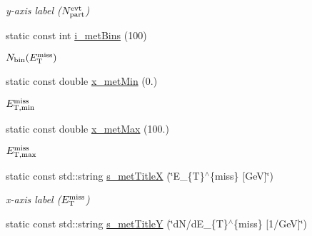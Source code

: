 \begin{CompactItemize}
\begin{CompactList}\small\item\em y-axis label ($N_{\rm part}^{\rm evt}$) \item\end{CompactList}\item 
\hypertarget{namespaceHistGroupCfg_a5919ec5c6e2e327615d4a42c79d1a22}{
static const int \hyperlink{namespaceHistGroupCfg_a5919ec5c6e2e327615d4a42c79d1a22}{i\_\-met\-Bins} (100)}
\label{namespaceHistGroupCfg_a5919ec5c6e2e327615d4a42c79d1a22}

\begin{CompactList}\small\item\em $N_{\rm bin}(E_{\rm T}^{\rm miss})$ \item\end{CompactList}\item 
\hypertarget{namespaceHistGroupCfg_c09ff4ad88eb1618f212854266a700d2}{
static const double \hyperlink{namespaceHistGroupCfg_c09ff4ad88eb1618f212854266a700d2}{x\_\-met\-Min} (0.)}
\label{namespaceHistGroupCfg_c09ff4ad88eb1618f212854266a700d2}

\begin{CompactList}\small\item\em $E_{\rm T,min}^{\rm miss}$ \item\end{CompactList}\item 
\hypertarget{namespaceHistGroupCfg_77eea0043761f373bed612346ce02c5c}{
static const double \hyperlink{namespaceHistGroupCfg_77eea0043761f373bed612346ce02c5c}{x\_\-met\-Max} (100.)}
\label{namespaceHistGroupCfg_77eea0043761f373bed612346ce02c5c}

\begin{CompactList}\small\item\em $E_{\rm T,max}^{\rm miss}$ \item\end{CompactList}\item 
\hypertarget{namespaceHistGroupCfg_acad476ffd2963af1fe203a5791b0fdf}{
static const std::string \hyperlink{namespaceHistGroupCfg_acad476ffd2963af1fe203a5791b0fdf}{s\_\-met\-Title\-X} (\char`\"{}E\_\-\{T\}$^\wedge$\{miss\} \mbox{[}Ge\-V\mbox{]}\char`\"{})}
\label{namespaceHistGroupCfg_acad476ffd2963af1fe203a5791b0fdf}

\begin{CompactList}\small\item\em x-axis label ($E_{\rm T}^{\rm miss}$) \item\end{CompactList}\item 
\hypertarget{namespaceHistGroupCfg_0a00761a944c8e81ac727985b6bf8e54}{
static const std::string \hyperlink{namespaceHistGroupCfg_0a00761a944c8e81ac727985b6bf8e54}{s\_\-met\-Title\-Y} (\char`\"{}d\-N/d\-E\_\-\{T\}$^\wedge$\{miss\} \mbox{[}1/Ge\-V\mbox{]}\char`\"{})}
\label{namespaceHistGroupCfg_0a00761a944c8e81ac727985b6bf8e54}


\end{CompactItemize}
